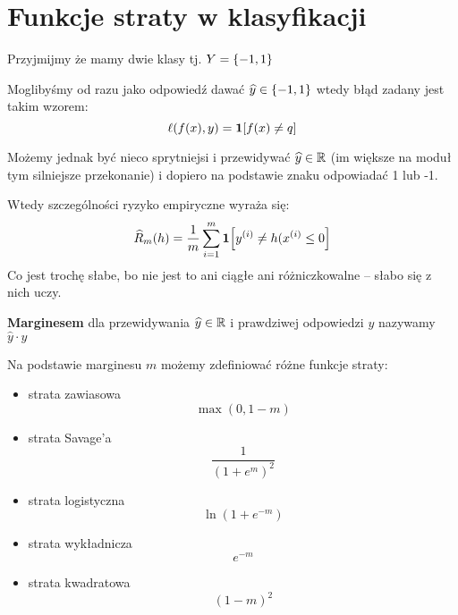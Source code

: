 \section{Funkcje straty w klasyfikacji}
Przyjmijmy że mamy dwie klasy tj. \( Y = \set{-1, 1} \)

Moglibyśmy od razu jako odpowiedź dawać \( \widehat y \in \set{-1, 1}\)
wtedy błąd zadany jest takim wzorem:
\[
	\ell(f(x), y) = \indicator{f(x) \neq q}
\]

Możemy jednak być nieco sprytniejsi i przewidywać \( \widehat y \in \mathbb{R} \) (im większe na moduł tym silniejsze przekonanie) i dopiero na podstawie znaku odpowiadać 1 lub -1.

Wtedy szczególności ryzyko empiryczne wyraża się:
\[
	\widehat R_m(h) = \frac{1}{m} \sum_{i=1}^m \indicator{y^{(i)} \neq h(x^{(i)} \leq 0}
\]
Co jest trochę słabe, bo nie jest to ani ciągłe ani różniczkowalne -- słabo się z nich uczy.

\begin{definition}
	\textbf{Marginesem} dla przewidywania \( \widehat y \in \mathbb{R} \) i prawdziwej odpowiedzi \( y \) nazywamy \( \widehat y \cdot y \)
\end{definition}

Na podstawie marginesu \( m \) możemy zdefiniować różne funkcje straty:
\begin{itemize}
	\item strata zawiasowa
	      \[
		      \max(0, 1 - m)
	      \]
	\item strata Savage'a
	      \[
		      \frac{1}{(1 + e^m)^2}
	      \]
	\item strata logistyczna
	      \[
		      \ln(1 + e^{-m})
	      \]
	\item strata wykładnicza
	      \[
		      e^{-m}
	      \]
	\item strata kwadratowa
	      \[
		      (1 - m)^2
	      \]

\end{itemize}